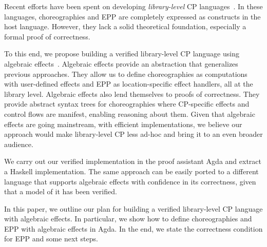 Recent efforts have been spent on developing \emph{library-level} CP languages~\citep{shen-2023, kashiwa-2023}.
%
In these languages, choreographies and EPP are completely expressed as constructs in the host language.
%
However, they lack a solid theoretical foundation, especially a formal proof of correctness.

To this end, we propose building a verified library-level CP language using algebraic effects~\citep{plotkin-2003, plotkin-2013}.
%
Algebraic effects provide an abstraction that generalizes previous approaches.
%
They allow us to define choreographies as computations with user-defined effects and EPP as location-specific effect handlers, all at the library level.
%
Algebraic effects also lend themselves to proofs of correctness.
%
They provide abstract syntax trees for choreographies where CP-specific effects and control flows are manifest, enabling reasoning about them.
%
Given that algebraic effects are going mainstream, with efficient implementations, we believe our approach would make library-level CP less ad-hoc and bring it to an even broader audience.

We carry out our verified implementation in the proof assistant Agda and extract a Haskell implementation.
%
The same approach can be easily ported to a different language that supports algebraic effects with confidence in its correctness, given that a model of it has been verified. 

In this paper, we outline our plan for building a verified library-level CP language with algebraic effects.
%
In particular, we show how to define choreographies and EPP with algebraic effects in Agda.
%
In the end, we state the correctness condition for EPP and some next steps.
